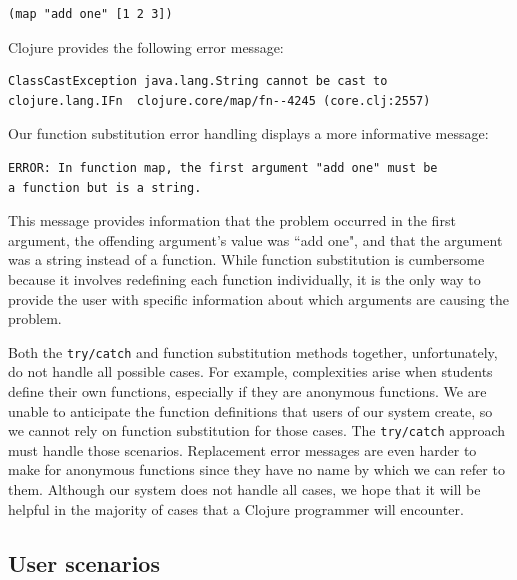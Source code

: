 \documentclass[12pt]{article}
\newcommand{\comment}[1]{{\bf \tt  {#1}}}
\newcommand{\pscomment}[1]{\textcolor{Coquelicot}{\comment{Paul: {#1}}}}
\newcommand{\alcomment}[1]{\textcolor{red}{\comment{Lemmon: {#1}}}}
\begin{document}
\begin{verbatim}
(map "add one" [1 2 3])
\end{verbatim}

Clojure provides the following error message:

\begin{verbatim}
ClassCastException java.lang.String cannot be cast to
clojure.lang.IFn  clojure.core/map/fn--4245 (core.clj:2557)
\end{verbatim}

Our function substitution error handling displays a more informative message:
\begin{verbatim}
ERROR: In function map, the first argument "add one" must be
a function but is a string.
\end{verbatim}

This message provides information that the problem occurred in the first argument, the offending argument's value was ``add one", and that the argument was a string instead of a function. While function substitution is cumbersome because it involves redefining each function individually, it is the only way to provide the user with specific information about which arguments are causing the problem.


Both the \texttt{try/catch} and function substitution methods together, unfortunately, do not handle all possible cases.
For example, complexities arise when students define their own functions, especially if they are anonymous functions.
We are unable to anticipate the function definitions that users of our system create, so we cannot rely on function substitution 
for those cases.
The \texttt{try/catch} approach must handle those scenarios.
Replacement error messages are even harder to make for anonymous functions since they have no name by which we can refer to them.
Although our system does not handle all cases, we hope that it will be helpful in the majority of cases that a Clojure programmer 
will encounter.



\subsection{User scenarios}\label{sec:scenarios}
\end{document}

